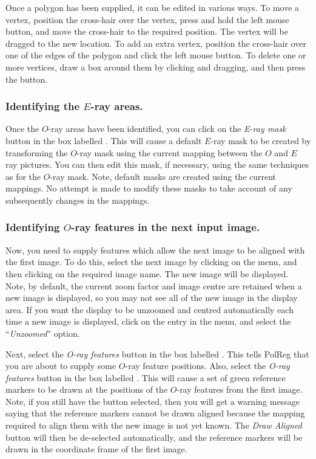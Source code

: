 Once a polygon has been supplied, it can be edited in various ways. To
move a vertex, position the cross-hair over the vertex, press and hold
the left mouse button, and move the cross-hair to the required position.
The vertex will be dragged to the new location. To add an extra vertex,
position the cross-hair over one of the edges of the polygon and click
the left mouse button. To delete one or more vertices, draw a box around 
them by clicking and dragging, and then press the  button.

\subsubsection {Identifying the $E$-ray areas.}
Once the $O$-ray areas have been identified, you can click on the {\em
E-ray mask} button in the box labelled . This will cause a default $E$-ray mask to be
created by transforming the $O$-ray mask using the current mapping
between the $O$ and $E$ ray pictures. You can then edit this mask, if
necessary, using the same techniques as for the $O$-ray mask. Note,
default masks are created using the current mappings. No attempt is made
to modify these masks to take account of any subsequently changes in
the mappings.

\subsubsection {Identifying $O$-ray features in the next input image.}
Now, you need to supply features which allow the next image to be
aligned with the first image. To do this, select the next image by
clicking on the  menu, and then
clicking on the required image name. The new image will be displayed.
Note, by default, the current zoom factor and image centre are retained
when a new image is displayed, so you may not see all of the new image in
the display area. If you want the display to be unzoomed and centred
automatically each time a new image is displayed, click on the
 entry in the  menu, and select the ``{\em Unzoomed}'' option.

Next, select the {\em O-ray features} button in the box labelled
. This tells PolReg that you are
about to supply some $O$-ray feature positions. Also, select the 
{\em O-ray features} button in the box labelled
. This will cause
a set of green reference markers to be drawn at the positions of the
$O$-ray features from the first image. Note, if you still have the
 button selected, then
you will get a warning message saying that the reference markers cannot
be drawn aligned because the mapping required to align them with the new
image is not yet known. The {\em Draw Aligned} button will then be
de-selected automatically, and the reference markers will be drawn in the
coordinate frame of the first image.

